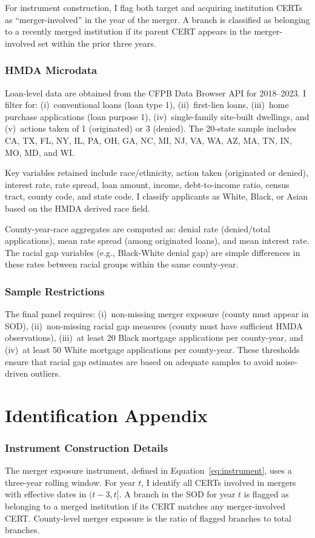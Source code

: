 \documentclass[12pt]{article}
\begin{document}
For instrument construction, I flag both target and acquiring institution CERTs as ``merger-involved'' in the year of the merger. A branch is classified as belonging to a recently merged institution if its parent CERT appears in the merger-involved set within the prior three years.

\subsubsection*{HMDA Microdata} Loan-level data are obtained from the CFPB Data Browser API for 2018--2023. I filter for: (i)~conventional loans (loan type 1), (ii)~first-lien loans, (iii)~home purchase applications (loan purpose 1), (iv)~single-family site-built dwellings, and (v)~actions taken of 1 (originated) or 3 (denied). The 20-state sample includes CA, TX, FL, NY, IL, PA, OH, GA, NC, MI, NJ, VA, WA, AZ, MA, TN, IN, MO, MD, and WI.

Key variables retained include race/ethnicity, action taken (originated or denied), interest rate, rate spread, loan amount, income, debt-to-income ratio, census tract, county code, and state code. I classify applicants as White, Black, or Asian based on the HMDA derived race field.

County-year-race aggregates are computed as: denial rate (denied/total applications), mean rate spread (among originated loans), and mean interest rate. The racial gap variables (e.g., Black-White denial gap) are simple differences in these rates between racial groups within the same county-year.

\subsubsection*{Sample Restrictions} The final panel requires: (i)~non-missing merger exposure (county must appear in SOD), (ii)~non-missing racial gap measures (county must have sufficient HMDA observations), (iii)~at least 20 Black mortgage applications per county-year, and (iv)~at least 50 White mortgage applications per county-year. These thresholds ensure that racial gap estimates are based on adequate samples to avoid noise-driven outliers.


\section{Identification Appendix}
\label{app:identification}

\subsubsection*{Instrument Construction Details} The merger exposure instrument, defined in Equation~\ref{eq:instrument}, uses a three-year rolling window. For year $t$, I identify all CERTs involved in mergers with effective dates in $(t-3, t]$. A branch in the SOD for year $t$ is flagged as belonging to a merged institution if its CERT matches any merger-involved CERT. County-level merger exposure is the ratio of flagged branches to total branches.
\end{document}

